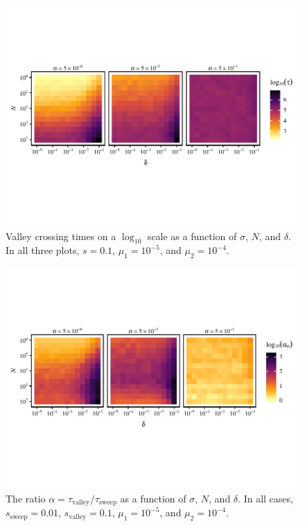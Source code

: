 \documentclass[10pt,twocolumn,twoside]{gsajnl}
\begin{document}
\begin{spacing}{1.5}
\begin{figure}[t]
  \includegraphics[width=\textwidth]{Figures/log_tau_s0-1.pdf}
  \caption{Valley crossing times on a $\log_{10}$ scale as a function of $\sigma$, $N$, and $\delta$. In all three plots, $s = 0.1$, $\mu_1 = 10^{-5}$, and $\mu_2 = 10^{-4}$.}
\label{fig:tau}
\end{figure}
\begin{figure}[t]
  \includegraphics[width=\textwidth]{Figures/log_alpha_s0-1.pdf}
\caption{The ratio $\alpha = \tau_{\mathrm{valley}}/\tau_{\mathrm{sweep}}$ as a function of $\sigma$, $N$, and $\delta$. In all cases, $s_{\mathrm{sweep}} = 0.01$, $s_{\mathrm{valley}} = 0.1$, $\mu_1 = 10^{-5}$, and $\mu_2 = 10^{-4}$.}
\label{fig:tau-ratios}
\end{figure}


\end{spacing}
\end{document}
